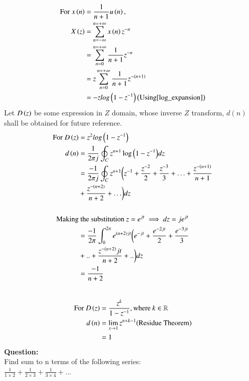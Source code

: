\documentclass[journal,12pt,twocolumn]{IEEEtran}
\theoremstyle{remark}
\begin{document}
\begin{align}
	\notag \text{For } x\left(n\right) &= \frac{1}{n+1}u\left(n\right),\\
	X\left(z\right) &=\sum_{n= -\infty}^{n= +\infty} x\left(n\right)z^{-n}\\
	&= \sum_{n = 0}^{n = +\infty} \frac{1}{n+1}z^{-n}\\
	&= z\sum_{n = 0}^{n = +\infty} \frac{1}{n+1}z^{-\left(n+1\right)} \\
	&= -zlog\left(1-z^{-1}\right) \left(\text{Using} \eqref{log_expansion}\right) \label{When_c_equals_1}	
\end{align}
\newpage
Let $D\left(z\right)$ be some expression in $Z$ domain, whose inverse $Z$ transform, $d(n)$ shall be obtained for future reference.\\
\begin{align}
    \notag\text{For }D\left(z\right) &= z^{2}log\left(1-z^{-1}\right)\\
    d\left(n\right)&=\frac{1}{2\pi j} \oint _C z^{n+1}\log{\ensuremath{\left(1-z^{-1}\right)}}dz\\
    &=\frac{-1}{2\pi j} \oint _C z^{n+1}\biggl(z^{-1}+\frac{z^{-2}}{2} + \frac{z^{-3}}{3}+\ldots + \frac{z^{-(n+1)}}{n+1} \notag\\ \;\: &+  \frac{z^{-\left(n+2\right)}}{n+2}+ \ldots \biggr) dz\\ 
\notag \\   
\notag\text{Making}&\text{ the substitution }z=e^{jt} \implies dz = je^{jt}\\
    &=\frac{-1}{2\pi} \int_{0}^{2\pi} e^{\left(n+2\right)jt}\biggl(e^{-jt}+\frac{e^{-2jt}}{2} + \frac{e^{-3jt}}{3} \notag \\&+.. +\frac{z^{-\left(n+2\right)}jt}{n+2}+..\biggr) dz\\
    &=\frac{-1}{n+2}\label{11027_eq2}
\end{align}
\\
\begin{align}
    \notag \text{For }D\left(z\right)&= \frac{z^k}{1-z^{-1}},\text{where} \: k \in \mathbb{R}\\
    d\left(n\right)&= \lim_{x \to 1}z^{n+k-1} \text{(Residue Theorem)}\\
    &= 1\label{11027_eq3}
\end{align}
\newpage
\textbf{Question:} \\
Find sum to n terms of the following series:\\
$\frac{1}{1 \times 2} + \frac{1}{2 \times 3} + \frac{1}{3 \times 4} + \ldots$
\bigskip \bigskip
\end{document}
